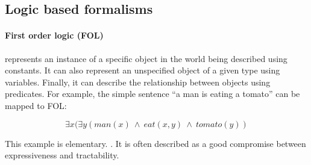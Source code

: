 



\subsection{Logic based formalisms}






\paragraph{First order logic (FOL)} represents an instance of a specific object in the world being described using constants. It can also represent an unspecified object of a given type using variables. Finally, it can describe the relationship between objects using predicates. For example, the simple sentence “a man is eating a tomato” can be mapped to FOL:

\begin{equation}
    \exists x (\exists y (man(x) \ \land \ eat(x, y) \  \land \ tomato(y))
\end{equation}

This example is elementary. . It is often described as a good compromise between expressiveness and tractability. 

